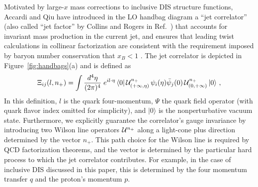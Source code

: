 \documentclass[preprintnumbers,floatfix,nofootinbib]{revtex4}
\newcommand{\de}{d}                    %
\begin{document}
Motivated by large-$x$ mass corrections to inclusive DIS structure functions,
Accardi and Qiu have introduced in the LO handbag diagram 
a ``jet correlator'' (also called ``jet factor'' by Collins and Rogers in Ref.~\cite{Collins:2007ph})
that accounts for invariant mass production in the current jet, and ensures
that leading twist calculations in collinear factorization are consistent with
the requirement imposed by baryon number conservation that $x_B<1$
\cite{Accardi:2008ne}. The jet correlator is depicted in
Figure~\ref{fig:handbags}(a) and is defined as 
\begin{align} 
\Xi_{ij}(l,n_+) =\int
  \frac{\de^4\eta}{(2\pi)^4}\; e^{i l \cdot \eta}\,
    \langle 0|\, {\cal U}^{n_+}_{(+\infty,\eta)}
\,\psi_i(\eta)
             \bar{\psi}_j(0)\,
{\cal U}^{n_+}_{(0,+\infty)}\,   |0 \rangle \ ,
\label{e:xifull}
\end{align} 
In this definition, $l$ is the quark four-momentum, $\Psi$ the quark field
operator (with quark flavor index omitted for simplicity), and $|0\rangle$ is
the nonperturbative vacuum state. Furthermore, we explicitly guarantee the
correlator's gauge invariance by introducing two Wilson line operators ${\cal
  U}^{n_+}$ along a light-cone plus direction determined by the vector
$n_+$. This path choice for the Wilson line is required by QCD factorization
theorems, and the vector is determined by the particular hard process to which
the jet correlator contributes. For example, in the case of inclusive DIS
discussed in this paper, this is determined by the four momentum transfer $q$
and the proton's momentum $p$. 
\end{document}
